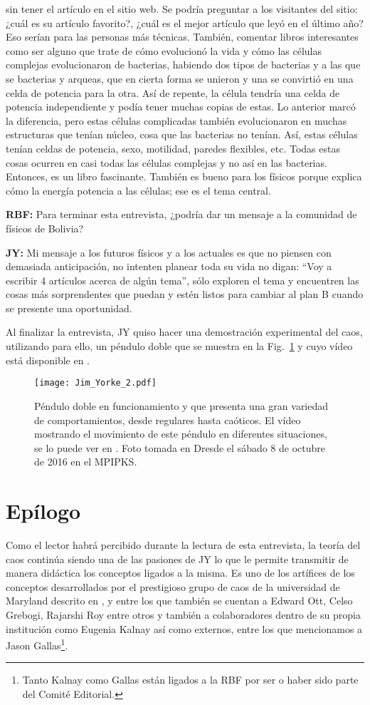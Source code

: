 \documentclass{rbf}
\newcommand{\mr}{{\bf RBF: }}
\newcommand{\jim}{{\bf JY: }}
\begin{document}
sin tener el artículo en el sitio web. Se podría preguntar a los visitantes del sitio:  ¿cuál es su artículo favorito?, ¿cuál es el mejor artículo que leyó en el último año? Eso serían para las personas más técnicas. También, comentar libros interesantes como ser alguno que trate de cómo evolucionó la vida y cómo las células complejas evolucionaron de bacterias, habiendo dos tipos de bacterias y a las que se bacterias y arqueas, que en cierta forma se unieron y una se convirtió en una celda de potencia para la otra. Así de repente, la célula tendría una celda de potencia independiente y podía tener muchas copias de estas. Lo anterior marcó la diferencia, pero estas células complicadas también evolucionaron en muchas estructuras que tenían núcleo, cosa que las bacterias no tenían. Así, estas células tenían  celdas de potencia, sexo, motilidad, paredes flexibles, etc. Todas estas cosas ocurren en casi todas las células complejas y no así en las bacterias. Entonces, es un libro fascinante. También es bueno para los físicos porque explica cómo la energía potencia a las células; ese es el tema central.

\mr Para terminar esta entrevista, ¿podría dar un mensaje a la comunidad de físicos de Bolivia?

\jim Mi mensaje a los futuros físicos y a los actuales es que no piensen con demasiada anticipación, no intenten planear toda su vida
no digan: ``Voy a escribir 4 artículos acerca de algún tema'', sólo exploren el tema y encuentren las cosas más sorprendentes que puedan
y estén listos para cambiar al plan B cuando se presente una oportunidad.

Al finalizar la entrevista, JY quiso hacer una demostración experimental del caos, utilizando para ello, un péndulo doble que se muestra en la Fig.~\ref{JY2} y cuyo vídeo está disponible en \cite{YT16}.
\begin{figure}[tbp!]
 \centering
  \texttt{[image: Jim\_Yorke\_2.pdf]}
 \caption{Péndulo doble en funcionamiento y que presenta una gran variedad de comportamientos, desde regulares hasta caóticos. El vídeo mostrando el movimiento de este péndulo en diferentes situaciones, se lo puede ver en \cite{YT16}. Foto tomada en Dresde el sábado 8 de octubre de 2016 en el MPIPKS.}
 \label{JY2}
\end{figure}

\section{Epílogo}\label{epi}
Como el lector habrá percibido durante la lectura de esta entrevista, la teoría del caos continúa siendo una de las pasiones de JY lo que le permite transmitir de manera didáctica los conceptos ligados a la misma. Es uno de los artífices de los conceptos desarrollados por el prestigioso grupo de caos de la universidad de Maryland descrito en \cite{UMD17}, y entre los que también se cuentan a Edward Ott, Celso Grebogi, Rajarshi Roy entre otros y también a colaboradores dentro de su propia institución como Eugenia Kalnay así como externos, entre los que mencionamos a Jason Gallas\footnote{Tanto Kalnay como Gallas están ligados a la RBF por ser o haber sido parte del Comité Editorial.}.
\end{document}
